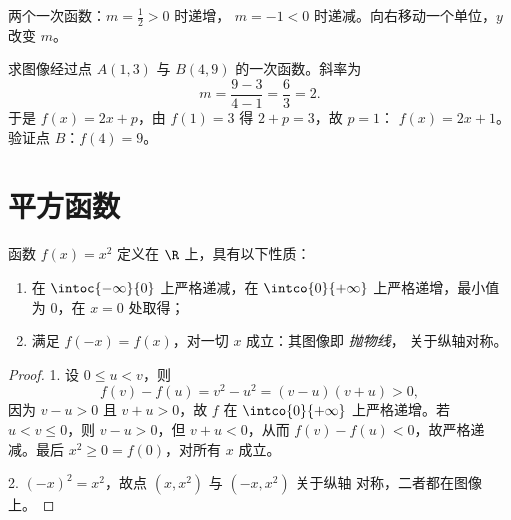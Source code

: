 \begin{omfigure}

{\small 两个一次函数：$m = \frac12 > 0$ 时递增，
$m = -1 < 0$ 时递减。向右移动一个单位，$y$ 改变 $m$。}
\end{omfigure}

\begin{example}\label{ex:g10:reffunc:affine}
求图像经过点 $A(1, 3)$ 与
$B(4, 9)$ 的一次函数。斜率为
\[
m = \frac{9 - 3}{4 - 1} = \frac{6}{3} = 2 .
\]
于是 $f(x) = 2x + p$，由 $f(1) = 3$ 得 $2 + p = 3$，故 $p = 1$：
$f(x) = 2x + 1$。验证点 $B$：$f(4) = 9$。
\end{example}

\section{平方函数}

\begin{proposition}[平方函数]\label{prop:g10:reffunc:square}
函数 $f(x) = x^2$ 定义在 $\R$ 上，具有以下性质：
\begin{enumerate}
  \item 在 $\intoc{-\infty}{0}$ 上严格递减，在
        $\intco{0}{+\infty}$ 上严格递增，最小值为 $0$，在 $x = 0$ 处取得；
  \item 满足 $f(-x) = f(x)$，对一切 $x$ 成立：其图像即
        \emph{抛物线}，
        关于纵轴对称。
\end{enumerate}
\end{proposition}

\begin{proof}
1. 设 $0 \leq u < v$，则
\[
f(v) - f(u) = v^2 - u^2 = (v - u)(v + u) > 0,
\]
因为 $v - u > 0$ 且 $v + u > 0$，故 $f$ 在
$\intco{0}{+\infty}$ 上严格递增。若 $u < v \leq 0$，则 $v - u > 0$，但
$v + u < 0$，从而 $f(v) - f(u) < 0$，故严格递减。最后
$x^2 \geq 0 = f(0)$，对所有 $x$ 成立。

2. $(-x)^2 = x^2$，故点 $(x, x^2)$ 与 $(-x, x^2)$ 关于纵轴
对称，二者都在图像上。
\end{proof}

